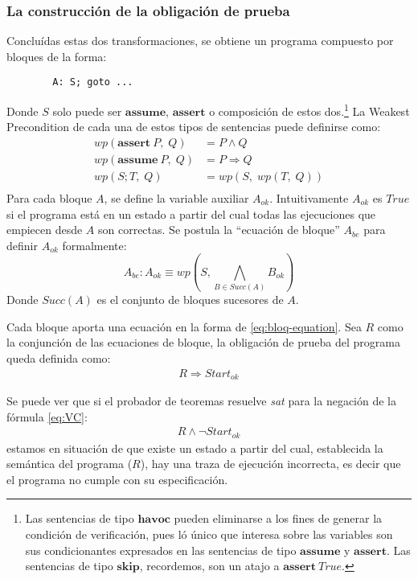 \documentclass[12pt, a4paper, openany, fleqn]{book}
\begin{document}
    \subsubsection*{La construcción de la obligación de prueba}
    Concluídas estas dos transformaciones, se obtiene un programa compuesto por bloques de la forma:
    \begin{verbatim}
        A: S; goto ...
    \end{verbatim} 
    Donde $S$ solo puede ser $\textbf{assume}$, $\textbf{assert}$ o composición de estos dos.\footnote{Las sentencias de tipo $\textbf{havoc}$ pueden eliminarse a los fines de generar la condición de verificación, pues ló único que interesa sobre las variables son sus condicionantes expresados en las sentencias de tipo $\textbf{assume}$ y $\textbf{assert}$. Las sentencias de tipo $\textbf{skip}$, recordemos, son un atajo a $\textbf{assert}\ True$.}
    La Weakest Precondition de cada una de estos tipos de sentencias puede definirse como:
    \begin{align*}
        wp(\textbf{assert}\ P,\;Q)   &= P \land Q \\
        wp(\textbf{assume}\  P,\; Q) &= P \Rightarrow Q \\
        wp(S;T,\;Q)                  &= wp(S,\;wp(T,\;Q)) \\
    \end{align*}
    Para cada bloque $A$, se define la variable auxiliar $A_{ok}$. Intuitivamente $A_{ok}$ es $True$ si el programa está en un estado a partir del cual todas las ejecuciones que empiecen desde $A$ son correctas. Se postula la ``ecuación de bloque'' $A_{be}$ para definir $A_{ok}$ formalmente:
    \begin{equation}
        \label{eq:bloq-equation}
        A_{be}: A_{ok} \equiv wp(S, \bigwedge_{B \in Succ(A)} B_{ok})
    \end{equation}
    Donde $Succ(A)$ es el conjunto de bloques sucesores de $A$.

    Cada bloque aporta una ecuación en la forma de \ref{eq:bloq-equation}. Sea $R$ como la conjunción de las ecuaciones de bloque, la obligación de prueba del programa queda definida como:
    \begin{align}
        R \Rightarrow Start_{ok} \label{eq:VC}
    \end{align}

    Se puede ver que si el probador de teoremas resuelve \textit{sat} para la negación de la fórmula \ref{eq:VC}:
    \begin{align*}
        R \land \lnot Start_{ok}
    \end{align*}
    \noindent estamos en situación de que existe un estado a partir del cual, establecida la semántica del programa ($R$), hay una traza de ejecución incorrecta, es decir que el programa no cumple con su especificación.
\end{document}

